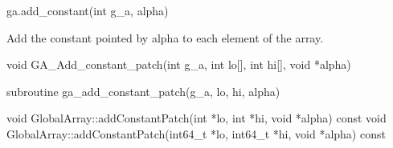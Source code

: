 \documentclass[12pt]{article}
\begin{document}
\begin{pyapi}
\begin{pycode}
ga.add_constant(int g_a, alpha)
\end{pycode}
\begin{funcargs}
\end{funcargs}
\end{pyapi}

\gcoll

\begin{desc}
Add the constant pointed by alpha to each element of the array.
\end{desc}


\begin{capi}
\begin{ccode}
void GA_Add_constant_patch(int g_a, int lo[], int hi[], void *alpha)
\end{ccode}
\begin{funcargs}
\end{funcargs}
\end{capi}

\begin{fapi}
\begin{fcode}
subroutine ga_add_constant_patch(g_a, lo, hi, alpha)
\end{fcode}
\begin{funcargs}
\end{funcargs}
\end{fapi}

\begin{cxxapi}
\begin{cxxcode}
void GlobalArray::addConstantPatch(int *lo, int *hi, void *alpha) const
void GlobalArray::addConstantPatch(int64_t *lo, int64_t *hi, void *alpha) const
\end{cxxcode}
\begin{funcargs}
\end{funcargs}
\end{cxxapi}
\end{document}
